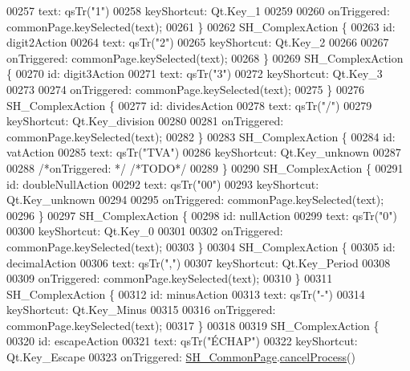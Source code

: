 \begin{DoxyCode}
00257         text: qsTr(\textcolor{stringliteral}{"1"})
00258         keyShortcut: Qt.Key\_1
00259 
00260         onTriggered: commonPage.keySelected(text);
00261     \}
00262     SH\_ComplexAction \{
00263         \textcolor{keywordtype}{id}: digit2Action
00264         text: qsTr(\textcolor{stringliteral}{"2"})
00265         keyShortcut: Qt.Key\_2
00266 
00267         onTriggered: commonPage.keySelected(text);
00268     \}
00269     SH\_ComplexAction \{
00270         \textcolor{keywordtype}{id}: digit3Action
00271         text: qsTr(\textcolor{stringliteral}{"3"})
00272         keyShortcut: Qt.Key\_3
00273 
00274         onTriggered: commonPage.keySelected(text);
00275     \}
00276     SH\_ComplexAction \{
00277         \textcolor{keywordtype}{id}: dividesAction
00278         text: qsTr(\textcolor{stringliteral}{"/"})
00279         keyShortcut: Qt.Key\_division
00280 
00281         onTriggered: commonPage.keySelected(text);
00282     \}
00283     SH\_ComplexAction \{
00284         \textcolor{keywordtype}{id}: vatAction
00285         text: qsTr(\textcolor{stringliteral}{"TVA"})
00286         keyShortcut: Qt.Key\_unknown
00287 
00288         \textcolor{comment}{/*onTriggered: */} \textcolor{comment}{/*TODO*/}
00289     \}
00290     SH\_ComplexAction \{
00291         \textcolor{keywordtype}{id}: doubleNullAction
00292         text: qsTr(\textcolor{stringliteral}{"00"})
00293         keyShortcut: Qt.Key\_unknown
00294 
00295         onTriggered: commonPage.keySelected(text);
00296     \}
00297     SH\_ComplexAction \{
00298         \textcolor{keywordtype}{id}: nullAction
00299         text: qsTr(\textcolor{stringliteral}{"0"})
00300         keyShortcut: Qt.Key\_0
00301 
00302         onTriggered: commonPage.keySelected(text);
00303     \}
00304     SH\_ComplexAction \{
00305         \textcolor{keywordtype}{id}: decimalAction
00306         text: qsTr(\textcolor{stringliteral}{","})
00307         keyShortcut: Qt.Key\_Period
00308 
00309         onTriggered: commonPage.keySelected(text);
00310     \}
00311     SH\_ComplexAction \{
00312         \textcolor{keywordtype}{id}: minusAction
00313         text: qsTr(\textcolor{stringliteral}{"-"})
00314         keyShortcut: Qt.Key\_Minus
00315 
00316         onTriggered: commonPage.keySelected(text);
00317     \}
00318 
00319     SH\_ComplexAction \{
00320         \textcolor{keywordtype}{id}: escapeAction
00321         text: qsTr(\textcolor{stringliteral}{"ÉCHAP"})
00322         keyShortcut: Qt.Key\_Escape
00323         onTriggered: \hyperlink{classSH__CommonPage}{SH\_CommonPage}.\hyperlink{classSH__CommonPage_a500427619a33ea991ed173fa0ac3b446}{cancelProcess}()

\end{DoxyCode}
